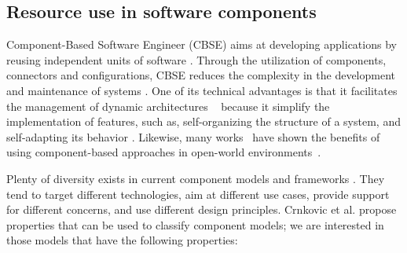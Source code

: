 
%
%
%


\subsection{Resource use in software components} \label{sec:components-oriented-resource-awareness}

Component-Based Software Engineer (CBSE) aims at developing applications by reusing independent units of software \cite{cbse-conference, Crnkovic2011}.
Through the utilization of components, connectors and configurations, CBSE reduces the complexity in the development and maintenance of systems \cite{xadl,Medvidovic:2000,VanOmmering-et-al-00}.
One of its technical advantages is that it facilitates the management of dynamic architectures
~\cite{DBLP:journals/ase/NittoGMPP08, Johnson:2015:CSM:2735960.2735979}
because it simplify the implementation of features, such as, self-organizing the structure of a system, and self-adapting its behavior
\cite{PanzicaLaManna:2012:LDU:2304736.2304764, Johnson:2015:CSM:2735960.2735979,Zhang:2009:MVD:1509239.1509262}.
Likewise, many works~\cite{cbse-conference} have shown the benefits of using component-based approaches in open-world environments~\cite{baresi2006toward, Caporuscio:2010:AIA:1985522.1985547, Perez-Palacin:2010:PAO:1712605.1712614}.

Plenty of diversity exists in current component models and frameworks \cite{Heineman2001, SZYPERSKI2002, Crnkovic2011}.
They tend to target different technologies, aim at different use cases, provide support for different concerns, and use different design principles.
Crnkovic et al. \cite{Crnkovic2011} propose properties that can be used to classify component models; we are interested in those models that have the following properties:

